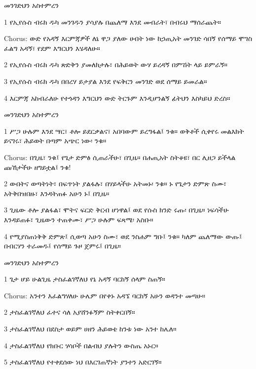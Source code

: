 \documentclass[12pt]{article}
\begin{document}
\begin{hymn}{4}{መንገድህን አስተምረን}
\begin{stanza}
1 የኢየሱስ ብሩክ ዱካ
መንገዱን ያሳያሉ
በጨለማ እንደ መብራት፣
በብሩህ ማሰራጨት።
\end{stanza}
\begin{chorus}
Chorus: ውድ የአዳኝ እርምጃዎች
ለኔ ዋጋ ያለው ሀብት ነው
ከኃጢአት መንገድ ሳበኝ
የሰማይ ሞገስ ፈልግ
አዳኝ፣ የደም እግርህን እሄዳለሁ።
\end{chorus}
\begin{stanza}
2 የኢየሱስ ብሩክ ዱካ 
ጽድቅን ያመለክታሉ፣
በሕይወት ውሃ ይረዳኝ
በምሽት ላይ ይምራኝ።
\end{stanza}
\begin{stanza}
3 የኢየሱስ ብሩክ ዱካ 
በበረሃ ይታያል
እንደ የፍቅርን መንገድ
ወደ ሰማይ ይመራል።
\end{stanza}
\begin{stanza}
4 እርምጃ አከብራለሁ
የተጎዳን እግርህን
ውድ ትርጉም እንዲሆንልኝ
ፊትህን እስካይህ ድረስ።
\end{stanza}
\end{hymn}

\begin{hymn}{4}{መንገድህን አስተምረን}
\begin{stanza}
1 ሥጋ ሁሉም እንደ ሣር፣
ቶሎ ይደርቃልና፣
አበባውም ይረግፋል፤
ንቁ።
ወቅቶች ሲቀየሩ
መልእክት ይናገሩ፣
ሕይወት በጣም አጭር ነው፡
ንቁ።
\end{stanza}
\begin{chorus}
Chorus: በጊዜ፣ ንቁ፤
የጌታ ድምፅ ሲጠራችሁ፣
በጊዜ።
በሐጢአት ስትቆዩ፣
በር ሊዘጋ ይችላል
ጩኸታችሁ ዘግይቷል፤
ንቁ!
\end{chorus}
\begin{stanza}
2 ውበትና ወጣትነት፣
በፍጥነት ያልፋሉ፣
በሃይላችሁ አትመኑ፡
ንቁ።
ኑ የጌታን ድምጽ ስሙ፣
አትቅበዝበዙ፣
እንዳትጠፉ አሁን ኑ፤
በጊዜ።
\end{stanza}
\begin{stanza}
3 ጊዜው ቶሎ ያልፋል፣
ሞትና ፍርድ ቅርብ ሆነዋል፤
ወደ የሱስ ክንድ ሩጡ፡
በጊዜ።
ነፍሳችሁ እንዳይጠፉ፣
ጊዜውን ተጠቀሙ፣
ሥጋ ሁሉም ፍጻሜ፡
አስቡ።
\end{stanza}
\begin{stanza}
4 የሚያስጠነቅቅ ድምጽ፤
ሲወጣ አሁን ስሙ፣
ወደ ንስሐም ግቡ፤
ንቁ።
ካለም ጨለማው ውጡ፤
በብርሃን ተራመዱ፤
የሰማይ ጉዞ ጀምሩ፤
በጊዜ።
\end{stanza}
\end{hymn}

\begin{hymn}{4}{መንገድህን አስተምረን}
\begin{stanza}
1 ጌታ ሆይ ሁልጊዜ
ታስፈልገኛለህ
የኔ አዳኝ ባርከኝ
ሰላም ስጠኝ።
\end{stanza}
\begin{chorus}
Chorus: አንተን እፈልግሃለሁ
ሁሌም በየቀኑ
አዳኜ ባርከኝ አሁን
ወዳንተ መጣሁ።
\end{chorus}
\begin{stanza}
2 ታስፈልገኛለህ
ፈተና ሳለ
አያሸንፉኝም
ስትቀርበኝ።
\end{stanza}
\begin{stanza}
3 ታስፈልገኛለህ
በደስታ ወይም ሀዘን
ሕይወቴ ከንቱ ነው
አንተ ከሌለ።
\end{stanza}
\begin{stanza}
4 ታስፈልገኛለህ
የክቡር ሃሳቦች
በልብህ ያሉትን
ውስጤ አኑር።
\end{stanza}
\begin{stanza}
5 ታስፈልገኛለህ
የተቀደሰው ነህ
በእርገጠኛነት
ያንተን አድርገኝ።
\end{stanza}
\end{hymn}
\end{document}

